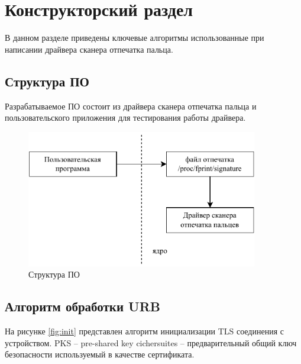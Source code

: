 \chapter{Конструкторский раздел}

В данном разделе приведены ключевые алгоритмы использованные при написании драйвера сканера отпечатка пальца.

\section{Структура ПО}

Разрабатываемое ПО состоит из драйвера сканера отпечатка пальца и пользовательского приложения для тестирования работы драйвера.

\begin{figure}[h!]
    \centering
    \includegraphics[width=0.9\textwidth]{img/structure-po}
    \caption{Структура ПО}
\end{figure}

\section{Алгоритм обработки URB}

На рисунке \ref{fig:init} представлен алгоритм инициализации TLS соединения с устройством. PKS -- pre-shared key cichersuites -- предварительный общий ключ безопасности используемый в качестве сертификата.


